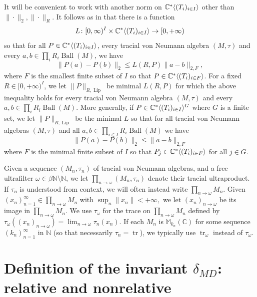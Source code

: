 \documentclass[10pt]{amsart}
\theoremstyle{definition}
\numberwithin{equation}{section}
\newcommand{\bC}{{\mathbb C}}
\newcommand{\bM}{{\mathbb M}}
\newcommand{\bN}{{\mathbb N}}
\DeclareMathOperator{\tr}{tr}
\DeclareMathOperator{\Ball}{Ball}
\DeclareMathOperator{\Lip}{Lip}
\DeclarePairedDelimiter{\ip}{\langle}{\rangle}
\begin{document}
It will be convenient to work with another norm on $\bC^{*}\ip{(T_{i})_{i\in I}}$ other than $\|\cdot\|_{2},\|\cdot\|_{R}$. It follows as in \cite[Lemma 3.1]{HJKECoho} that there is a function
\[L\colon [0,\infty)^{I}\times \bC^{*}\ip{(T_{i})_{i\in I}}\to [0,+\infty)\]
so that for all $P\in \bC^{*}\ip{(T_{i})_{i\in I}}$, every tracial von Neumann algebra $(M,\tau)$ and every $a,b\in \prod_{i}R_{i}\Ball(M)$, we have 
\[\|P(a)-P(b)\|_{2}\leq L(R,P)\|a-b\|_{2,F},\]
where $F$ is  the smallest finite subset of $I$ so that $P\in \bC^{*}\ip{(T_{i})_{i\in F}}$.
For a fixed $R\in [0,+\infty)^{I}$, we let $\|P\|_{R,\Lip}$ be minimal $L(R,P)$ for which the above inequality holds for  every tracial von Neumann algebra $(M,\tau)$ and every $a,b\in \prod_{i}R_{i}\Ball(M)$. More generally, if $P\in \bC^{*}\ip{(T_{i})_{i\in I}}^{G}$ where $G$ is a finite set, we let $\|P\|_{R,\Lip}$ be the minimal $L$ so that for all tracial von Neumann algebras $(M,\tau)$ and all $a,b\in \prod_{i\in I}R_{i}\Ball(M)$ we have 
\[\|P(a)-P(b)\|_{2}\leq \|a-b\|_{2,F}\]
where $F$ is the minimal finite subset of $I$ so that $P_{j}\in \bC^{*}\ip{(T_{i})_{i\in F}}$ for all $j\in G$. 


Given a sequence $(M_{n},\tau_{n})$ of tracial von Neumann algebras, and a free ultrafilter $\omega\in\beta\bN\setminus\bN$, we let $\prod_{n\to\omega}(M_{n},\tau_{n})$ denote their tracial ultraproduct. If $\tau_{n}$ is understood from context, we will often instead write $\prod_{n\to\omega}M_{n}$. Given $(x_{n})_{n=1}^{\infty}\in \prod_{n\to\omega}M_{n}$ with $\sup_{n}\|x_{n}\|<+\infty,$ we let $(x_{n})_{n\to\omega}$ be its image in $\prod_{n\to\omega}M_{n}$. We use $\tau_{\omega}$ for the trace on $\prod_{n\to\omega}M_{n}$ defined by $\tau_{\omega}((x_{n})_{n\to\omega})=\lim_{n\to\omega}\tau_{n}(x_{n})$. If each $M_{n}$ is $\bM_{k_{n}}(\bC)$ for some sequence $(k_{n})_{n=1}^{\infty}$ in $\bN$ (so that necessarily $\tau_{n}=\tr$), we typically use $\tr_{\omega}$ instead of $\tau_{\omega}$. 

\section{Definition of the invariant $\delta_{MD}$: relative and nonrelative}
\end{document}
